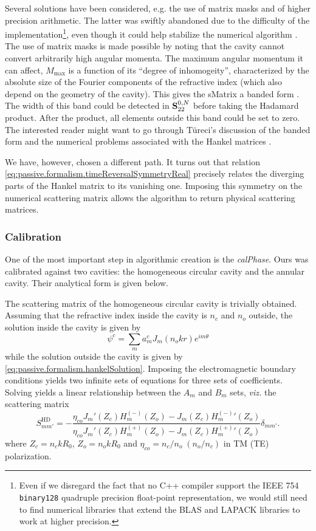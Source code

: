 Several solutions have been considered, e.g. the use of matrix masks
and of higher precision arithmetic. The latter was swiftly abandoned
due to the difficulty of the implementation\footnote{Even if we disregard
the fact that no C++ compiler support the IEEE 754 \texttt{binary128}
quadruple precision float-point representation, we would still need
to find numerical libraries that extend the BLAS and LAPACK libraries
to work at higher precision.}, even though it could help stabilize the
numerical algorithm \cite[\S 5.8.4]{MIS2002}. The use of matrix masks is 
made possible by noting that the cavity cannot convert arbitrarily
high angular momenta. The maximum angular momentum it can affect, 
$M_\text{max}$ is a function of its ``degree of inhomogeity'', 
characterized by the absolute size of the Fourier components
of the refractive index (which also depend on the geometry
of the cavity). This gives the \gls{sMatrix} a banded form 
. The width of
this band could be detected in $\mathbf{S}^{0,N}_{22}$ before
taking the Hadamard product. After the product, all elements
outside this band could be set to zero. The interested 
reader might want to go through Türeci's discussion of
the banded form and the numerical problems associated 
with the Hankel matrices \cite[\S 3.4]{TUR2003}.

We have, however, chosen a different path. 
It turns out that relation \eqref{eq:passive.formalism.timeReversalSymmetryReal}
precisely relates the diverging parts of the Hankel matrix
to its vanishing one. Imposing this symmetry on the numerical scattering
matrix allows the algorithm to return physical scattering matrices. 

\subsubsection{Calibration}
One of the most important step in algorithmic creation
is the \textit{\gls{calPhase}}. Ours was calibrated
against two cavities: the homogeneous circular cavity and 
the annular cavity. Their analytical form is given below.

The scattering matrix of the homogeneous circular cavity
is trivially obtained. Assuming that the refractive index inside
the cavity is $n_c$ and $n_o$ outside, the solution inside the 
cavity is given by 
  \begin{equation}
   \psi^c = \sum_m a_m^cJ_m(n_okr)e^{im\theta}
  \end{equation}
while the solution outside the cavity is given by \eqref{eq:passive.formalism.hankelSolution}.
Imposing the electromagnetic boundary conditions yields two infinite sets of equations
for three sets of coefficients. Solving yields a linear relationship between the 
$A_m$ and $B_m$ sets, \textit{viz.} the scattering matrix
  \begin{equation}
   S_{mm'}^\text{HD} = -  \frac{\eta_{co}J_m'(Z_c)H_m^{(-)}(Z_o)-J_m(Z_c){H^{(-)}_m}'(Z_o)}
				{\eta_{co}J_m'(Z_c)H_m^{(+)}(Z_o)-J_m(Z_c){H^{(+)}_m}'(Z_o)}\delta_{mm'}.
  \end{equation}
where $Z_c = n_ckR_0$, $Z_o=n_okR_0$ and $\eta_{co}= n_c/n_o\; (n_o/n_c)$ in TM (TE) polarization.

